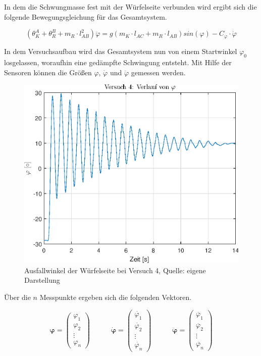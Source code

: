 In dem die Schwungmasse fest mit der Würfelseite verbunden wird ergibt sich die folgende Bewegungsgleichung für das Gesamtsystem.

\begin{equation}
\label{ermittlung_c_phi_equation}
(\theta^A_K + \theta^B_R + m_R  \cdot l_{AB}^2) \ddot{\varphi} = g(m_K \cdot l_{AC} + m_R \cdot l_{AB})sin(\varphi) - C_{\varphi} \cdot \dot{\varphi}
\end{equation}

In dem Versuchsaufbau wird das Gesamtsystem nun von einem Startwinkel $\varphi_0$ losgelassen, woraufhin eine gedämpfte Schwingung entsteht. Mit Hilfe der Sensoren können die Größen $\varphi$, $\dot{\varphi}$ und $\ddot{\varphi}$ gemessen werden.

\begin{figure}[h!]
\centering
 \includegraphics[width=0.5\linewidth]{img/V4_phi.eps}
	\caption{Ausfallwinkel der Würfelseite bei Versuch 4, Quelle: eigene Darstellung}
\end{figure}

Über die $n$ Messpunkte ergeben sich die folgenden Vektoren.

\begin{equation}
\boldsymbol{\varphi} = \begin{pmatrix} \varphi_1 \\ \varphi_2 \\ \vdots \\ \varphi_n \end{pmatrix} \hspace{35pt}
\boldsymbol{\dot{\varphi}} = \begin{pmatrix}
\dot{\varphi_1} \\ \dot{\varphi_2} \\ \vdots \\ \dot{\varphi_n}
\end{pmatrix} \hspace{35pt}
\boldsymbol{\ddot{\varphi}} = \begin{pmatrix}
\ddot{\varphi_1} \\ \ddot{\varphi_2} \\ \vdots \\ \ddot{\varphi_n}
\end{pmatrix}
\end{equation}

